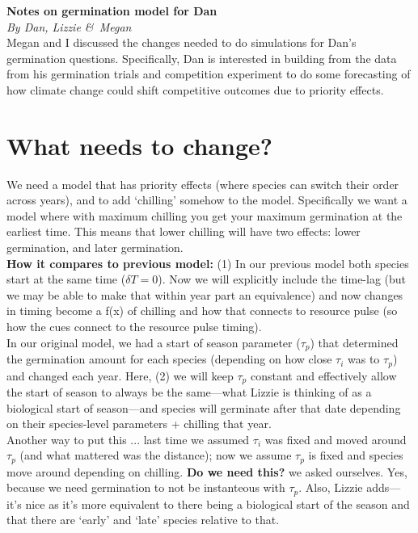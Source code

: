 \documentclass[11pt,letter]{article}
\begin{document}

\renewcommand{\refname}{\CHead{}}


{\bf Notes on germination model for Dan}\\
\emph{By Dan, Lizzie \&\ Megan}\\

Megan and I discussed the changes needed to do simulations for Dan's germination questions. Specifically, Dan is interested in building from the data from his germination trials and competition experiment to do some forecasting of how climate change could shift competitive outcomes due to priority effects.

\section{What needs to change?}

We need a model that has priority effects (where species can switch their order across years), and to add `chilling' somehow to the model. Specifically we want a model where with maximum chilling you get your maximum germination at the earliest time. This means that lower chilling will have two effects: lower germination, and later germination. \\

{\bf How it compares to previous model:} 
(1) In our previous model both species start at the same time ($\delta T = 0$). Now we will explicitly include the time-lag (but we may be able to make that within year part an equivalence) and now changes in timing become a f(x) of chilling and how that connects to resource pulse (so how the cues connect to the resource pulse timing).\\

In our original model, we had a start of season parameter ($\tau_p$) that determined the germination amount for each species (depending on how close $\tau_i$ was to $\tau_p$) and changed each year. Here, (2) we will keep $\tau_p$ constant and effectively allow the start of season to always be the same---what Lizzie is thinking of as a biological start of season---and species will germinate after that date depending on their species-level parameters + chilling that year. \\

Another way to put this ... last time we assumed $\tau_i$ was fixed and moved around $\tau_p$ (and what mattered was the distance); now we assume $\tau_p$ is fixed and species move around depending on chilling. {\bf Do we need this?} we asked ourselves. Yes, because we need germination to not be instanteous with $\tau_p$. Also, Lizzie adds---it's nice as it's more equivalent to there being a biological start of the season and that there are `early' and `late' species relative to that.
\end{document}
